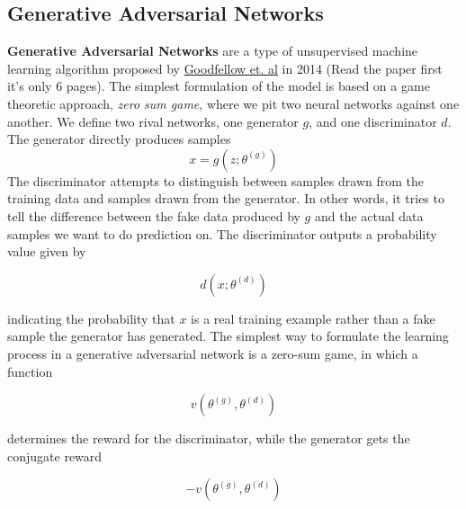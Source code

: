 \documentclass[%
oneside,                 %
final,                   %
10pt]{article}
\begin{document}
\subsection*{Generative Adversarial Networks}
\textbf{Generative Adversarial Networks} are a type of unsupervised machine learning
algorithm proposed by \href{{https://arxiv.org/pdf/1406.2661.pdf}}{Goodfellow et. al}
in 2014 (Read the paper first it's only 6 pages). The simplest formulation of
the model is based on a game theoretic approach, \emph{zero sum game}, where we pit
two neural networks against one another. We define two rival networks, one
generator $g$, and one discriminator $d$. The generator directly produces
samples
\begin{equation}
    x = g(z; \theta^{(g)})
\end{equation}
The discriminator attempts to distinguish between samples drawn from the
training data and samples drawn from the generator. In other words, it tries to
tell the difference between the fake data produced by $g$ and the actual data
samples we want to do prediction on. The discriminator outputs a probability
value given by

\begin{equation}
    d(x; \theta^{(d)})
\end{equation}

indicating the probability that $x$ is a real training example rather than a
fake sample the generator has generated. The simplest way to formulate the
learning process in a generative adversarial network is a zero-sum game, in
which a function

\begin{equation}
    v(\theta^{(g)}, \theta^{(d)})
\end{equation}

determines the reward for the discriminator, while the generator gets the
conjugate reward

\begin{equation}
    -v(\theta^{(g)}, \theta^{(d)})
\end{equation}
\end{document}
